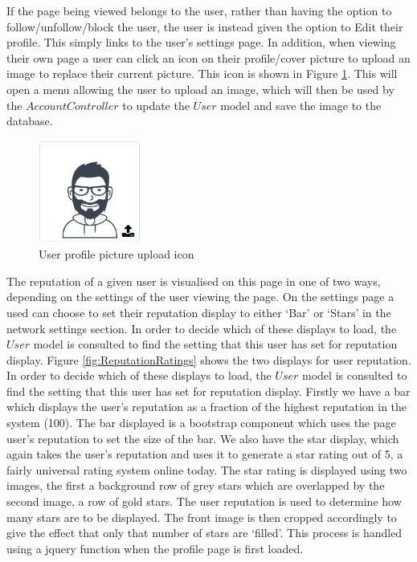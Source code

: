 If the page being viewed belongs to the user, rather than having the option to follow/unfollow/block the user, the user is instead given the option to Edit their profile. This simply links to the user's settings page. In addition, when viewing their own page a user can click an icon on their profile/cover picture to upload an image to replace their current picture. This icon is shown in Figure \ref{fig:ProfilePicUpload}. This will open a menu allowing the user to upload an image, which will then be used by the $AccountController$ to update the $User$ model and save the image to the database.

\begin{figure}[H]
\centering
\includegraphics[width=0.3\textwidth]{Images/Implementation/ProfilePicUpload}
\caption{User profile picture upload icon}
\label{fig:ProfilePicUpload}
\end{figure}

The reputation of a given user is visualised on this page in one of two ways, depending on the settings of the user viewing the page. On the settings page a used can choose to set their reputation display to either `Bar' or `Stars' in the network settings section. In order to decide which of these displays to load, the $User$ model is consulted to find the setting that this user has set for reputation display. Figure \ref{fig:ReputationRatings} shows the two displays for user reputation. In order to decide which of these displays to load, the $User$ model is consulted to find the setting that this user has set for reputation display. Firstly we have a bar which displays the user's reputation as a fraction of the highest reputation in the system (100). The bar displayed is a bootstrap component which uses the page user's reputation to set the size of the bar. We also have the star display, which again takes the user's reputation and uses it to generate a star rating out of 5, a fairly universal rating system online today. The star rating is displayed using two images, the first a background row of grey stars which are overlapped by the second image, a row of gold stars. The user reputation is used to determine how many stars are to be displayed. The front image is then cropped accordingly to give the effect that only that number of stars are `filled'. This process is handled using a jquery function when the profile page is first loaded.

